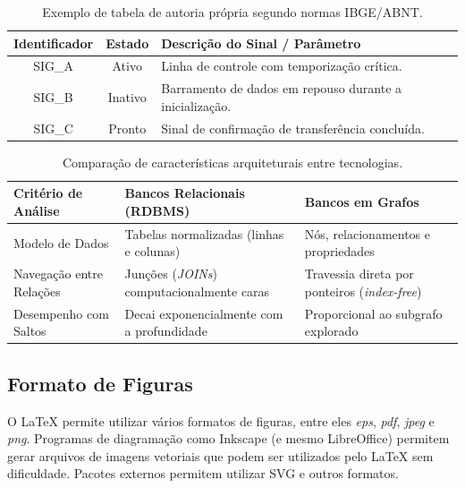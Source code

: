 \documentclass[ecp,tc,biblatex]{iiufrgs}
\begin{document}
\begin{table}[htbp]
    \centering
    \caption{Exemplo de tabela de autoria própria segundo normas IBGE/ABNT.}
    \label{tbl:ex1}
    \begin{tabular}{ccp{7cm}}
        \toprule
        \textbf{Identificador} & \textbf{Estado} & \textbf{Descrição do Sinal / Parâmetro} \\
        \midrule
        SIG\_A & Ativo   & Linha de controle com temporização crítica. \\
        SIG\_B & Inativo & Barramento de dados em repouso durante a inicialização. \\
        SIG\_C & Pronto  & Sinal de confirmação de transferência concluída. \\
        \bottomrule
    \end{tabular}
\end{table}

\begin{table}[htbp]
    \centering
    \caption{Comparação de características arquiteturais entre tecnologias.}
    \label{tbl:ex_externa}
    \begin{tabular}{p{3.8cm}p{4.5cm}p{4.8cm}}
        \toprule
        \textbf{Critério de Análise} & \textbf{Bancos Relacionais (RDBMS)} & \textbf{Bancos em Grafos} \\
        \midrule
        Modelo de Dados & Tabelas normalizadas (linhas e colunas) & Nós, relacionamentos e propriedades \\
        Navegação entre Relações & Junções (\textit{JOINs}) computacionalmente caras & Travessia direta por ponteiros (\textit{index-free}) \\
        Desempenho com Saltos & Decai exponencialmente com a profundidade & Proporcional ao subgrafo explorado \\
        \bottomrule
    \end{tabular}
\end{table}

\subsection{Formato de Figuras}
\label{sec:fig_format}

O LaTeX permite utilizar vários formatos de figuras, entre eles \emph{eps}, \emph{pdf}, \emph{jpeg} e \emph{png}. Programas de diagramação como Inkscape (e mesmo LibreOffice) permitem gerar arquivos de imagens vetoriais que podem ser utilizados pelo LaTeX sem dificuldade. Pacotes externos permitem utilizar SVG e outros formatos.
\end{document}
